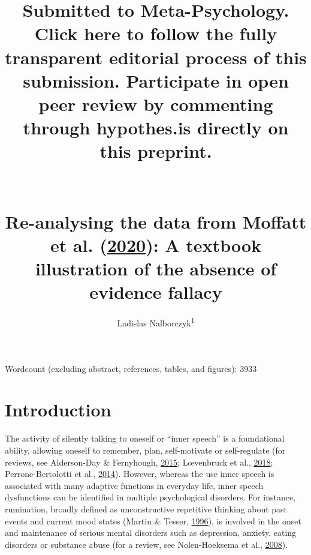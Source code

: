 \documentclass[
  english,
  man, donotrepeattitle,floatsintext]{apa6}
\author{Ladislas Nalborczyk\textsuperscript{1}}
\affiliation{
\vspace{0.5cm}
\textsuperscript{1} Univ. Grenoble Alpes, CNRS, Grenoble INP, GIPSA-lab, 38000 Grenoble, France}
\title{\textbf{Submitted to Meta-Psychology. Click here to follow the fully transparent editorial process of this submission. Participate in open peer review by commenting through hypothes.is directly on this preprint.}\\
~\\
~\\
Re-analysing the data from Moffatt et al. (\protect\hyperlink{ref-moffatt_inner_2020}{2020}): A textbook illustration of the absence of evidence fallacy}
\date{}
\begin{document}
\maketitle

Wordcount (excluding abstract, references, tables, and figures): 3933

\newpage

\hypertarget{introduction}{%
\section{Introduction}\label{introduction}}

The activity of silently talking to oneself or ``inner speech'' is a foundational ability, allowing oneself to remember, plan, self-motivate or self-regulate (for reviews, see Alderson-Day \& Fernyhough, \protect\hyperlink{ref-alderson-day_inner_2015}{2015}; Lœvenbruck et al., \protect\hyperlink{ref-loevenbruck_cognitive_2018}{2018}; Perrone-Bertolotti et al., \protect\hyperlink{ref-perrone-bertolotti_what_2014}{2014}). However, whereas the use inner speech is associated with many adaptive functions in everyday life, inner speech dysfunctions can be identified in multiple psychological disorders. For instance, rumination, broadly defined as unconstructive repetitive thinking about past events and current mood states (Martin \& Tesser, \protect\hyperlink{ref-Martin}{1996}), is involved in the onset and maintenance of serious mental disorders such as depression, anxiety, eating disorders or substance abuse (for a review, see Nolen-Hoeksema et al., \protect\hyperlink{ref-Nolen-Hoeksema2008}{2008}).
\end{document}
